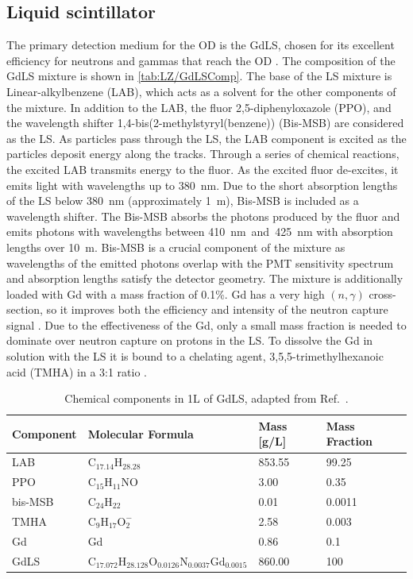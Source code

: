 \subsection{Liquid scintillator}\label{sec:LZ/LS}
The primary detection medium for the OD is the GdLS, chosen for its excellent efficiency for neutrons and gammas that reach the OD \cite{LZTDR}. The composition of the GdLS mixture is shown in \autoref{tab:LZ/GdLSComp}. The base of the LS mixture is Linear-alkylbenzene (LAB), which acts as a solvent for the other components of the mixture. In addition to the LAB, the fluor 2,5-diphenyloxazole (PPO), and the wavelength shifter 1,4-bis(2-methylstyryl(benzene)) (Bis-MSB) are considered as the LS. As particles pass through the LS, the LAB component is excited as the particles deposit energy along the tracks. Through a series of chemical reactions, the excited LAB transmits energy to the fluor. As the excited fluor de-excites, it emits light with wavelengths up to 380~nm. Due to the short absorption lengths of the LS below 380~nm (approximately 1~m), Bis-MSB is included as a wavelength shifter. The Bis-MSB absorbs the photons produced by the fluor and emits photons with wavelengths between 410~nm~and~425~nm with absorption lengths over 10~m. Bis-MSB is a crucial component of the mixture as wavelengths of the emitted photons overlap with the PMT sensitivity spectrum and absorption lengths satisfy the detector geometry.
The mixture is additionally loaded with Gd with a mass fraction of 0.1\%. Gd has a very high $(n,\gamma)$ cross-section, so it improves both the efficiency and intensity of the neutron capture signal \cite{LZTDR}. Due to the effectiveness of the Gd, only a small mass fraction is needed to dominate over neutron capture on protons in the LS. To dissolve the Gd in solution with the LS it is bound to a chelating agent, 3,5,5-trimethylhexanoic acid (TMHA) in a 3:1 ratio \cite{LZTDR,Haselschwardt:2018vmp}.
\begin{table}[!h]
    \centering
    \caption[Chemical components in 1L of GdLS.]{Chemical components in 1L of GdLS, adapted from Ref.~\cite{Haselschwardt:2018vmp}.}
    \begin{tabular}{llll}
        \hline\hline
        \textbf{Component} & \textbf{Molecular Formula} & \textbf{Mass [g/L]} & \textbf{Mass Fraction} \\
        \hline
        LAB & $\text{C}_{17.14}\text{H}_{28.28}$ & 853.55 & 99.25\\
        PPO & $\text{C}_{15}\text{H}_{11}\text{NO}$ & 3.00 & 0.35 \\
        bis-MSB & $\text{C}_{24}\text{H}_{22}$ & 0.01 & 0.0011\\
        TMHA & $\text{C}_{9}\text{H}_{17}\text{O}_{2}^{-}$ & 2.58 & 0.003\\
        Gd & Gd & 0.86 & 0.1 \\
        \hline
        GdLS & $\text{C}_{17.072} \text{H}_{28.128} \text{O}_{0.0126} \text{N}_{0.0037} \text{Gd}_{0.0015}$ & 860.00 & 100 \\
        \hline\hline
    \end{tabular}
    \label{tab:LZ/GdLSComp}
\end{table}

